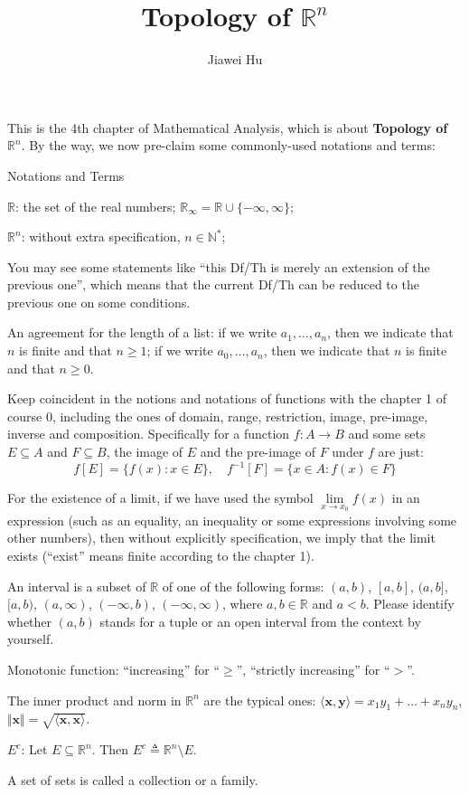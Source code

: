 \documentclass{article}
\title{\LARGE \textbf{Topology of $\mathbb{R}^n$}}
\author{\large Jiawei Hu}
\begin{document}
\maketitle

This is the 4th chapter of Mathematical Analysis, which is about \textbf{Topology of $\mathbb{R}^n$}. By the way, we now pre-claim some commonly-used notations and terms:
\begin{Df}{Notations and Terms}
    \begin{compactenum}
        \item $\mathbb{R}$: the set of the real numbers; $\mathbb{R}_\infty = \mathbb{R}\cup\{-\infty, \infty\}$;
        \item $\mathbb{R}^n$: without extra specification, $n\in\mathbb{N}^\ast$; 
        \item You may see some statements like ``this Df/Th is merely an extension of the previous one'', which means that the current Df/Th can be reduced to the previous one on some conditions.
        \item An agreement for the length of a list: if we write $a_1, \dots, a_n$, then we indicate that $n$ is finite and that $n\geq 1$; if we write $a_0, \dots, a_n$, then we indicate that $n$ is finite and that $n\geq 0$.
        \item Keep coincident in the notions and notations of functions with the chapter 1 of course 0, including the ones of domain, range, restriction, image, pre-image, inverse and composition. Specifically for a function $f: A\rightarrow B$ and some sets $E\subseteq A$ and $F\subseteq B$, the image of $E$ and the pre-image of $F$ under $f$ are just:
        $$f[E] = \{f(x): x\in E\},\quad f^{-1}[F] = \{x\in A: f(x)\in F\}$$
        \item For the existence of a limit, if we have used the symbol $\lim\limits_{x\to x_0} f(x)$ in an expression (such as an equality, an inequality or some expressions involving some other numbers), then without explicitly specification, we imply that the limit exists (``exist'' means finite according to the chapter 1).
        \item An interval is a subset of $\mathbb{R}$ of one of the following forms: $(a,b)$, $[a,b]$, $(a,b]$, $[a,b)$, $(a, \infty)$, $(-\infty, b)$, $(-\infty, \infty)$, where $a, b\in\mathbb{R}$ and $a<b$. Please identify whether $(a,b)$ stands for a tuple or an open interval from the context by yourself.
        \item Monotonic function: ``increasing'' for ``$\geq$'', ``strictly increasing'' for ``$>$''.
        \item The inner product and norm in $\mathbb{R}^n$ are the typical ones: $\langle \pmb{x}, \pmb{y}\rangle = x_1y_1 + \dots + x_ny_n$, $\Vert \pmb{x}\Vert = \sqrt{\langle \pmb{x}, \pmb{x}\rangle}$.
        \item $E^c$: Let $E\subseteq\mathbb{R}^n$. Then $E^c\triangleq \mathbb{R}^n\setminus E$.
        \item A set of sets is called a collection or a family.
    \end{compactenum}
\end{Df}
\end{document}
